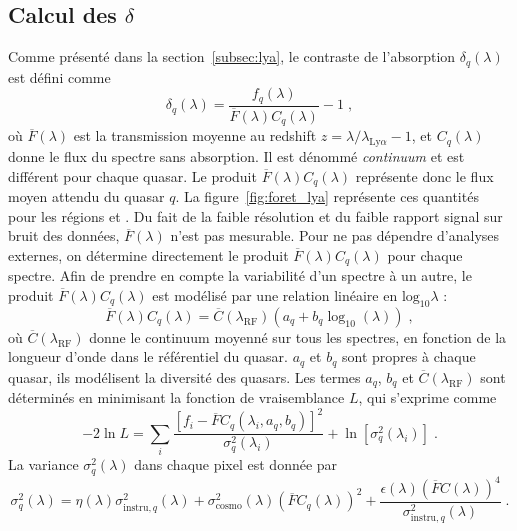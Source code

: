 \subsection{Calcul des $\delta$}
\label{subsec:calcul_delta}
Comme présenté dans la section~\ref{subsec:lya}, le contraste de l'absorption \lya{} $\delta_q(\lambda)$ est défini comme
\begin{equation}
  \label{eq:deltaF}
  \delta_q(\lambda) = \frac{f_q(\lambda)}{\overline F(\lambda) C_q(\lambda)} - 1 \;,
\end{equation}
où $\overline F(\lambda)$ est la transmission moyenne au redshift $z = \lambda / \lambda_{\mathrm{Ly}\alpha} - 1$, et $C_q(\lambda)$ donne le flux du spectre sans absorption. Il est dénommé \emph{continuum} et est différent pour chaque quasar.
Le produit $\overline F(\lambda) C_q(\lambda)$ représente donc le flux moyen attendu du quasar $q$.
La figure~\ref{fig:foret_lya} représente ces quantités pour les régions \lya{} et \lyb{}.
Du fait de la faible résolution et du faible rapport signal sur bruit des données, $\overline F(\lambda)$ n'est pas mesurable. Pour ne pas dépendre d'analyses externes, on détermine directement le produit $\overline F(\lambda) C_q(\lambda)$ pour chaque spectre.
Afin de prendre en compte la variabilité d'un spectre à un autre, le produit $\overline F(\lambda) C_q(\lambda)$ est modélisé par une relation linéaire en $\mathrm{log}_{10} \lambda$ :
\begin{equation}
  \label{eq:diversity}
  \overline F(\lambda) C_q(\lambda) = \overline C(\lambda_{\mathrm{RF}})(a_q + b_q \log_{10}(\lambda)) \; ,
\end{equation}
où $\overline C(\lambda_{\mathrm{RF}})$ donne le continuum moyenné sur tous les spectres, en fonction de la longueur d'onde dans le référentiel du quasar. $a_q$ et $b_q$ sont propres à chaque quasar, ils modélisent la diversité des quasars.
Les termes $a_q$, $b_q$ et $\overline C(\lambda_{\mathrm{RF}})$ sont déterminés en minimisant la fonction de vraisemblance $L$, qui s'exprime comme
\begin{equation}
  \label{eq:likelihood}
  - 2 \ln L = \sum\limits_{i} \frac{\left[f_{i} - \overline F C_q(\lambda_{i}, a_q, b_q)\right]^2}{\sigma_q^2 (\lambda_i)} + \ln [\sigma_q^2 (\lambda_i)] \;  .
\end{equation}
La variance $\sigma_q^2(\lambda)$ dans chaque pixel est donnée par
\begin{equation}
  \label{eq:variance}
  \sigma_q^2(\lambda) = \eta(\lambda) \sigma_{\mathrm{instru}, q}^2(\lambda) + \sigma_{\mathrm{cosmo}}^2 (\lambda) (\overline F C_q(\lambda))^2 + \frac{\epsilon(\lambda)(\overline F C(\lambda))^4}{\sigma_{\mathrm{instru},q}^2 (\lambda)}  \; .
\end{equation}
